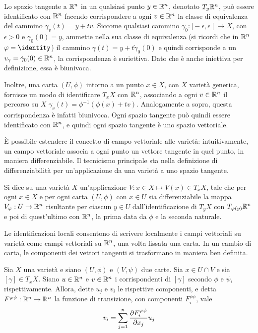 Lo spazio tangente a $\mathbb{R}^{n}$ in un qualsiasi punto $y \in \mathbb{R}^{n}$, denotato $T_y \mathbb{R}^{n}$, può essere identificato con $\mathbb{R}^{n}$ facendo corrispondere a ogni $v \in \mathbb{R}^{n}$ la classe di equivalenza del cammino $\gamma_v(t) = y + tv$. Siccome qualsiasi cammino $\gamma_0:]-\epsilon,\epsilon\;[\ \to X$, con $\epsilon > 0$ e $\gamma_0(0)=y$, ammette nella sua classe di equivalenza (si ricordi che in $\mathbb{R}^{n}$ $\phi = \identity$) il cammino $\gamma(t) = y + t\dot{\gamma}_0(0)$ e quindi corrisponde a un $v_{\gamma} = \dot{\gamma}_0(0) \in \mathbb{R}^{n}$, la corrispondenza è suriettiva. Dato che è anche iniettiva per definizione, essa è biunivoca. 

Inoltre, una carta $(U, \phi)$ intorno a un punto $x \in  X$, con $X$ varietà generica, fornisce un modo di identificare $T_x X$ con $\mathbb{R}^{n}$, associando a ogni $v \in \mathbb{R}^{n}$ il percorso su $X$ $\gamma_{v}(t) = \phi^{-1}(\phi(x)+tv)$. Analogamente a sopra, questa corrispondenza è infatti biunivoca. Ogni spazio tangente può quindi essere identificato con $\mathbb{R}^{n}$, e quindi ogni spazio tangente è uno spazio vettoriale.

È possibile estendere il concetto di campo vettoriale alle varietà: intuitivamente, un campo vettoriale associa a ogni punto un vettore tangente in quel punto, in maniera differenziabile. Il tecnicismo principale sta nella definizione di differenziabilità per un'applicazione da una varietà a uno spazio tangente.
\begin{definition} \label{def:vecField}
  Si dice  su una varietà $X$ un'applicazione $V: x \in  X \mapsto V (x) \in T_x X$, tale che per ogni $x \in X$ e per ogni carta $(U, \phi)$ con $x \in U$ sia differenziabile la mappa $V_\varphi:U \to \mathbb{R}^{n}$ risultante per ciascun $y \in  U$ dall'identificazione di $T_y X$ con $T_{\varphi(y)}\mathbb{R}^{n}$ e poi di quest'ultimo con $\mathbb{R}^{n}$, la prima data da $\phi$ e la seconda naturale.
\end{definition}

Le identificazioni locali consentono di scrivere localmente i campi vettoriali su varietà come campi vettoriali su $\mathbb{R}^{n}$, una volta fissata una carta. In un cambio di carta, le componenti dei vettori tangenti si trasformano in maniera ben definita.
\begin{theorem}
  Sia $X$ una varietà e siano $(U,\phi)$ e $(V,\psi)$ due carte. Sia $x \in  U \cap V$ e sia $[\gamma] \in  T_x X$. Siano $u \in \mathbb{R}^{n}$ e $v \in  \mathbb{R}^{n}$ i corrispondenti di $[\gamma]$ secondo $\phi$ e $\psi$, rispettivamente. Allora, dette $u_j$ e $v_i$ le rispettive componenti, e detta $F^{\varphi\psi}:\mathbb{R}^{n} \to \mathbb{R}^{n}$ la funzione di transizione, con componenti $F^{\phi \psi}_i$, vale \begin{equation}
  v_i = \sum_{j=1}^n \pdv{F^{\varphi\psi}_i}{x_j} u_j
  \end{equation} 
\end{theorem}

